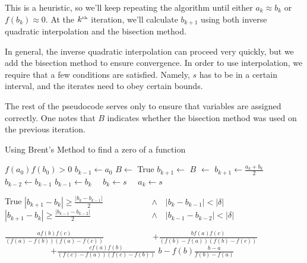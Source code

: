 \documentclass[twocolumn,11pt]{article}
\begin{document}
This is a heuristic, so we'll keep repeating the algorithm until either
$a_k \approx b_k$ or $f(b_k) \approx 0$. At the $k^{\mbox{{\tiny th}}}$ iteration,
we'll calculate $b_{k+1}$ using both inverse quadratic interpolation and the
bisection method.

In general, the inverse quadratic interpolation can proceed very quickly, but we
add the bisection method to ensure convergence. In order to use interpolation,
we require that a few conditions are satisfied. Namely, $s$ has to be in a certain
interval, and the iterates need to obey certain bounds.

The rest of the pseudocode serves only to ensure that variables are assigned
correctly. One notes that $B$ indicates whether the bisection method was used
on the previous iteration.

\begin{algorithm}
  \caption{Using Brent's Method to find a zero of a function}
  \label{alg:brent}
  \begin{algorithmic}
    \Require $f(a_0)f(b_0) > 0$
      \EndIf
      \State $b_{k-1} \gets a_0$
      \State $B \gets$ True 
      \EndIf
      \State $b_{k+1} \gets$
      \State $B$ $\gets$ 
        \State $\displaystyle b_{k+1} \gets \frac{a_k+b_k}{2}$ 
      \EndIf
      \State $b_{k-2} \gets b_{k-1}$
      \State $b_{k-1} \gets b_k$
      ~~$b_k \gets s$
      \Else~~$a_k \gets s$
      \EndIf
      \EndWhile
    \EndFunction
  \end{algorithmic}
  \begin{algorithmic}
      \State \Return True
      \State \Return
        $\displaystyle |b_{k+1}-b_k| \geq \frac{|b_k-b_{k-1}|}{2}$
      \State ~~~~~~~~~~~$\land$~~$|b_k-b_{k-1}| < |\delta|$
      \Else~
      \Return $\displaystyle |b_{k+1}-b_k| \geq \frac{|b_{k-1}-b_{k-2}|}{2}$
      \State ~~~~~~~~~~~~~~$\land$~~$|b_{k-1}-b_{k-2}| < |\delta|$
      \EndIf
    \EndFunction
  \end{algorithmic}
  \begin{algorithmic}
        \State \Return $\displaystyle \frac{af(b)f(c)}{(f(a)-f(b))(f(a)-f(c))}$
        \State ~~~~~~~~~~~$\displaystyle + \frac{bf(a)f(c)}{(f(b)-f(a))(f(b)-f(c))}$
        \State ~~~~~~~~~~~$\displaystyle + \frac{cf(a)f(b)}{(f(c)-f(a))(f(c)-f(b))}$
      \Else
        \State \Return $\displaystyle b - f(b)\frac{b-a}{f(b)-f(a)}$
      \EndIf
    \EndFunction
  \end{algorithmic}
\end{algorithm}
\end{document}
